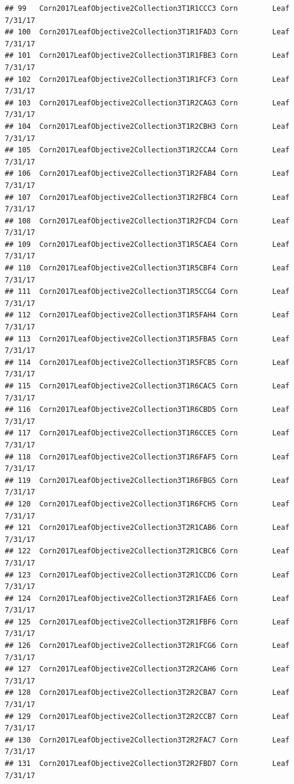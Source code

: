\documentclass[
]{article}
\begin{document}
\begin{verbatim}
## 99   Corn2017LeafObjective2Collection3T1R1CCC3 Corn        Leaf     7/31/17
## 100  Corn2017LeafObjective2Collection3T1R1FAD3 Corn        Leaf     7/31/17
## 101  Corn2017LeafObjective2Collection3T1R1FBE3 Corn        Leaf     7/31/17
## 102  Corn2017LeafObjective2Collection3T1R1FCF3 Corn        Leaf     7/31/17
## 103  Corn2017LeafObjective2Collection3T1R2CAG3 Corn        Leaf     7/31/17
## 104  Corn2017LeafObjective2Collection3T1R2CBH3 Corn        Leaf     7/31/17
## 105  Corn2017LeafObjective2Collection3T1R2CCA4 Corn        Leaf     7/31/17
## 106  Corn2017LeafObjective2Collection3T1R2FAB4 Corn        Leaf     7/31/17
## 107  Corn2017LeafObjective2Collection3T1R2FBC4 Corn        Leaf     7/31/17
## 108  Corn2017LeafObjective2Collection3T1R2FCD4 Corn        Leaf     7/31/17
## 109  Corn2017LeafObjective2Collection3T1R5CAE4 Corn        Leaf     7/31/17
## 110  Corn2017LeafObjective2Collection3T1R5CBF4 Corn        Leaf     7/31/17
## 111  Corn2017LeafObjective2Collection3T1R5CCG4 Corn        Leaf     7/31/17
## 112  Corn2017LeafObjective2Collection3T1R5FAH4 Corn        Leaf     7/31/17
## 113  Corn2017LeafObjective2Collection3T1R5FBA5 Corn        Leaf     7/31/17
## 114  Corn2017LeafObjective2Collection3T1R5FCB5 Corn        Leaf     7/31/17
## 115  Corn2017LeafObjective2Collection3T1R6CAC5 Corn        Leaf     7/31/17
## 116  Corn2017LeafObjective2Collection3T1R6CBD5 Corn        Leaf     7/31/17
## 117  Corn2017LeafObjective2Collection3T1R6CCE5 Corn        Leaf     7/31/17
## 118  Corn2017LeafObjective2Collection3T1R6FAF5 Corn        Leaf     7/31/17
## 119  Corn2017LeafObjective2Collection3T1R6FBG5 Corn        Leaf     7/31/17
## 120  Corn2017LeafObjective2Collection3T1R6FCH5 Corn        Leaf     7/31/17
## 121  Corn2017LeafObjective2Collection3T2R1CAB6 Corn        Leaf     7/31/17
## 122  Corn2017LeafObjective2Collection3T2R1CBC6 Corn        Leaf     7/31/17
## 123  Corn2017LeafObjective2Collection3T2R1CCD6 Corn        Leaf     7/31/17
## 124  Corn2017LeafObjective2Collection3T2R1FAE6 Corn        Leaf     7/31/17
## 125  Corn2017LeafObjective2Collection3T2R1FBF6 Corn        Leaf     7/31/17
## 126  Corn2017LeafObjective2Collection3T2R1FCG6 Corn        Leaf     7/31/17
## 127  Corn2017LeafObjective2Collection3T2R2CAH6 Corn        Leaf     7/31/17
## 128  Corn2017LeafObjective2Collection3T2R2CBA7 Corn        Leaf     7/31/17
## 129  Corn2017LeafObjective2Collection3T2R2CCB7 Corn        Leaf     7/31/17
## 130  Corn2017LeafObjective2Collection3T2R2FAC7 Corn        Leaf     7/31/17
## 131  Corn2017LeafObjective2Collection3T2R2FBD7 Corn        Leaf     7/31/17

\end{verbatim}
\end{document}
